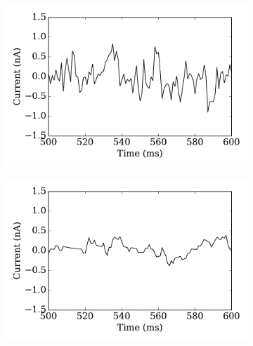 	\begin{figure}[tbp!]
		\centering
		\par
		\begin{subfigure}[t]{0.43\textwidth}
			\includegraphics[width=\textwidth]{pics_iconip/curr_tau1.pdf}
			\caption{}
		\end{subfigure}
		\begin{subfigure}[t]{0.43\textwidth}
			\includegraphics[width=\textwidth]{pics_iconip/curr_tau10.pdf}
			\caption{}
		\end{subfigure}\\
		\begin{subfigure}[t]{0.43\textwidth}

\end{subfigure}
\end{figure}
